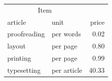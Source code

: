 \begin{frame}[fragile]
\begin{multicols}{2}
\columnbreak{}

\begin{tabular}[t]{llr}
\multicolumn{2}{c}{Item} &  \\
\cline{1-2}
article & unit & price \\
\hline
proofreading & per words & 0.02 \\
layout & per page & 0.80 \\
printing & per page & 0.99 \\
typesetting & per article & 40.33 \\
\end{tabular}

%

\end{multicols}
\end{frame}


